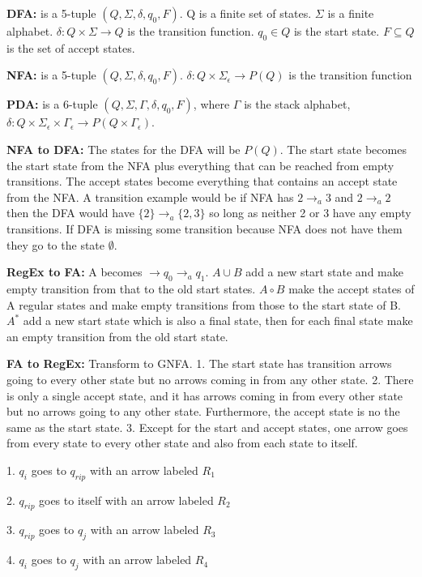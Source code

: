 \documentclass[12pt]{article}
\begin{document}
\textbf{DFA:} is a 5-tuple $(Q,\Sigma,\delta,q_0,F)$. Q is a finite set of states. $\Sigma$ is a finite alphabet. $\delta: Q \times \Sigma \rightarrow Q$ is the transition function. $q_0 \in Q$ is the start state. $F \subseteq Q$ is the set of accept states.

\textbf{NFA:} is a 5-tuple $(Q,\Sigma,\delta,q_0,F)$. $\delta: Q \times \Sigma_\epsilon \rightarrow P(Q)$ is the transition function

\textbf{PDA:} is a 6-tuple $(Q,\Sigma,\Gamma,\delta,q_0,F)$, where $\Gamma$ is the stack alphabet, $\delta: Q \times \Sigma_\epsilon \times \Gamma_\epsilon \rightarrow P(Q \times \Gamma_\epsilon)$.

\textbf{NFA to DFA:} The states for the DFA will be $P(Q)$. The start state becomes the start state from the NFA plus everything that can be reached from empty transitions. The accept states become everything that contains an accept state from the NFA. A transition example would be if NFA has $2 \rightarrow_a 3$ and $2 \rightarrow_a 2$ then the DFA would have $\{2\} \rightarrow_a \{2,3\}$ so long as neither 2 or 3 have any empty transitions. If DFA is missing some transition because NFA does not have them they go to the state $\emptyset$.

\textbf{RegEx to FA:} A becomes $\rightarrow q_0 \rightarrow_a q_1$. $A \cup B$ add a new start state and make empty transition from that to the old start states. $A \circ B$ make the accept states of A regular states and make empty transitions from those to the start state of B. $A^*$ add a new start state which is also a final state, then for each final state make an empty transition from the old start state.

\textbf{FA to RegEx:} Transform to GNFA. 1. The start state has transition arrows going to every other state but no arrows coming in from any other state. 2. There is only a single accept state, and it has arrows coming in from every other state but no arrows going to any other state. Furthermore, the accept state is no the same as the start state. 3. Except for the start and accept states, one arrow goes from every state to every other state and also from each state to itself.

1. $q_i$ goes to $q_{rip}$ with an arrow labeled $R_1$

2. $q_{rip}$ goes to itself with an arrow labeled $R_2$

3. $q_{rip}$ goes to $q_j$ with an arrow labeled $R_3$

4. $q_i$ goes to $q_j$ with an arrow labeled $R_4$
\end{document}
